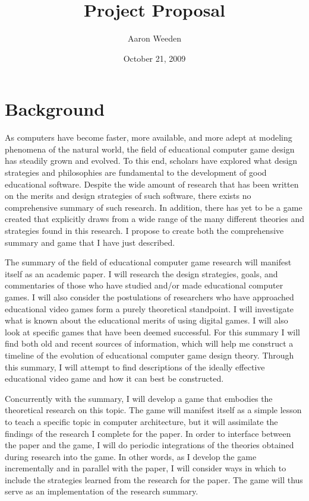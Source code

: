 \documentclass[11pt]{article}	%
\title{Project Proposal}	%
\author{Aaron Weeden}					%
\date{October 21, 2009}						%
\begin{document}
\maketitle							%
\thispagestyle{empty}				%

\doublespacing						%

\section*{Background}

As computers have become faster, more available, and more adept at modeling phenomena of the natural world, the field of educational computer game design has steadily grown and evolved.  To this end, scholars have explored what design strategies and philosophies are fundamental to the development of good educational software.  Despite the wide amount of research that has been written on the merits and design strategies of such software, there exists no comprehensive summary of such research.  In addition, there has yet to be a game created that explicitly draws from a wide range of the many different theories and strategies found in this research.  I propose to create both the comprehensive summary and game that I have just described.

The summary of the field of educational computer game research will manifest itself as an academic paper.  I will research the design strategies, goals, and commentaries of those who have studied and/or made educational computer games.  I will also consider the postulations of researchers who have approached educational video games form a purely theoretical standpoint.  I will investigate what is known about the educational merits of using digital games.  I will also look at specific games that have been deemed successful.  For this summary I will find both old and recent sources of information, which will help me construct a timeline of the evolution of educational computer game design theory.  Through this summary, I will attempt to find descriptions of the ideally effective educational video game and how it can best be constructed.

Concurrently with the summary, I will develop a game that embodies the theoretical research on this topic.  The game will manifest itself as a simple lesson to teach a specific topic in computer architecture, but it will assimilate the findings of the research I complete for the paper.  In order to interface between the paper and the game, I will do periodic integrations of the theories obtained during research into the game.  In other words, as I develop the game incrementally and in parallel with the paper, I will consider ways in which to include the strategies learned from the research for the paper.  The game will thus serve as an implementation of the research summary.
\end{document}
